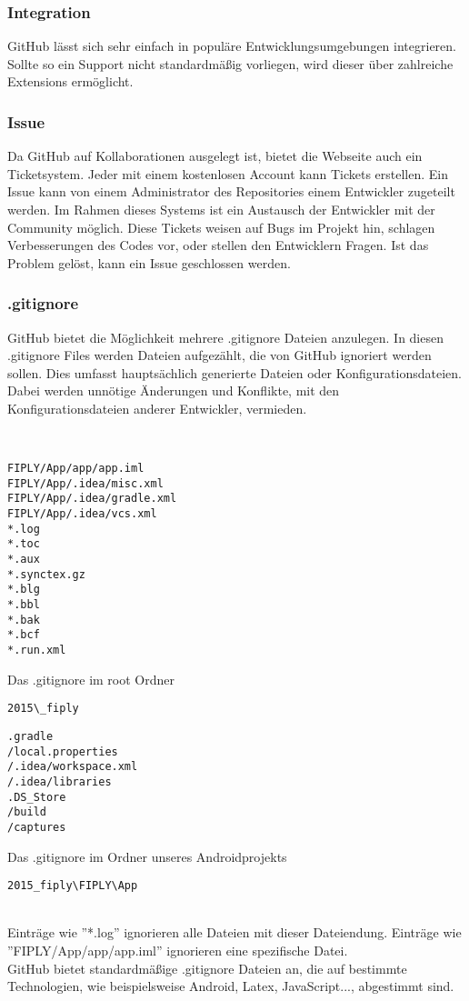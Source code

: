 \documentclass[FIPLY_base.tex]{subfiles}
\begin{document}
\subsubsection{Integration}
GitHub lässt sich sehr einfach in populäre Entwicklungsumgebungen integrieren. 
Sollte so ein Support nicht standardmäßig vorliegen, wird dieser über zahlreiche Extensions ermöglicht.

\subsubsection{Issue}
Da GitHub auf Kollaborationen ausgelegt ist, bietet die Webseite auch ein Ticketsystem.
Jeder mit einem kostenlosen Account kann Tickets erstellen. Ein Issue kann von einem Administrator des Repositories einem Entwickler zugeteilt werden.
Im Rahmen dieses Systems ist ein Austausch der Entwickler mit der Community möglich.
Diese Tickets weisen auf Bugs im Projekt hin, schlagen Verbesserungen des Codes vor, oder stellen den Entwicklern Fragen.
Ist das Problem gelöst, kann ein Issue geschlossen werden.

\subsubsection{.gitignore}
GitHub bietet die Möglichkeit mehrere .gitignore Dateien anzulegen.
In diesen .gitignore Files werden Dateien aufgezählt, die von GitHub ignoriert werden sollen. 
Dies umfasst hauptsächlich generierte Dateien oder Konfigurationsdateien.
Dabei werden unnötige Änderungen und Konflikte, mit den Konfigurationsdateien anderer Entwickler, vermieden. 

\ \\
\begin{minipage}{.45\textwidth}
\begin{lstlisting}
FIPLY/App/app/app.iml
FIPLY/App/.idea/misc.xml
FIPLY/App/.idea/gradle.xml
FIPLY/App/.idea/vcs.xml
*.log
*.toc
*.aux
*.synctex.gz
*.blg
*.bbl
*.bak
*.bcf
*.run.xml
\end{lstlisting}
Das .gitignore im root Ordner \begin{verbatim}2015\_fiply\end{verbatim}
\end{minipage}\hfill
\begin{minipage}{.45\textwidth}
\begin{lstlisting}
.gradle
/local.properties
/.idea/workspace.xml
/.idea/libraries
.DS_Store
/build
/captures
\end{lstlisting}
Das .gitignore im Ordner unseres Androidprojekts \begin{verbatim}2015_fiply\FIPLY\App\end{verbatim} 
\end{minipage}
\ \\
Einträge wie ''*.log'' ignorieren alle Dateien mit dieser Dateiendung. \newline
Einträge wie ''FIPLY/App/app/app.iml'' ignorieren eine spezifische Datei.
\ \\
GitHub bietet standardmäßige .gitignore Dateien an, die auf bestimmte Technologien, wie beispielsweise Android, Latex, JavaScript...,  abgestimmt sind.
\end{document}

